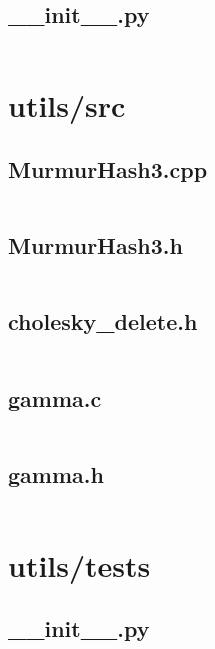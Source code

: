 \documentclass{article}
\begin{document}
\subsection{\_\_init\_\_.py}
\inputminted{python}{/home/dufferzafar/dev/@clones/scikit-learn/sklearn/utils/sparsetools/tests/__init__.py}
\newpage

\section{utils/src}

\subsection{MurmurHash3.cpp}
\inputminted{cpp}{/home/dufferzafar/dev/@clones/scikit-learn/sklearn/utils/src/MurmurHash3.cpp}
\newpage

\subsection{MurmurHash3.h}
\inputminted{c}{/home/dufferzafar/dev/@clones/scikit-learn/sklearn/utils/src/MurmurHash3.h}
\newpage

\subsection{cholesky\_delete.h}
\inputminted{c}{/home/dufferzafar/dev/@clones/scikit-learn/sklearn/utils/src/cholesky_delete.h}
\newpage

\subsection{gamma.c}
\inputminted{c}{/home/dufferzafar/dev/@clones/scikit-learn/sklearn/utils/src/gamma.c}
\newpage

\subsection{gamma.h}
\inputminted{c}{/home/dufferzafar/dev/@clones/scikit-learn/sklearn/utils/src/gamma.h}
\newpage

\section{utils/tests}

\subsection{\_\_init\_\_.py}
\inputminted{python}{/home/dufferzafar/dev/@clones/scikit-learn/sklearn/utils/tests/__init__.py}
\newpage
\end{document}
